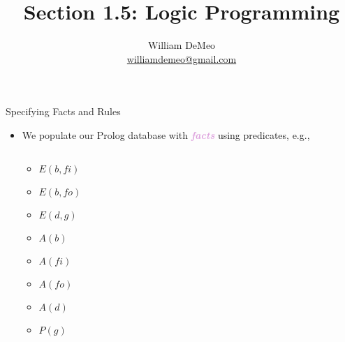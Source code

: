 \documentclass[xcolor=dvipsnames,9pt,hide notes]{beamer}
\title[Sec. 1.5: Logic Programming]{Section 1.5: Logic Programming}
\author[William DeMeo]{William DeMeo\\
{\small \url{williamdemeo@gmail.com}}}
\institute[\url{williamdemeo@gmail}]{
  \vskip-1cm
  {\small {\color{darkred}  University of South Carolina}}
}
\theoremstyle{definition}
\theoremstyle{remark}
\numberwithin{theorem}{section}
\numberwithin{claim}{section}
\numberwithin{equation}{section}
\numberwithin{conjecture}{section}
\newcommand{\defn}[1]{\textcolor{Plum}{\textit{\textbf{#1}}}}
\begin{document}
\thicklines
\setcounter{section}{+1}
\setcounter{secnumdepth}{2}


\frame[label=titlepage]{

  \titlepage
}

\begin{frame}[shrink=5]{Specifying Facts and Rules}
  \begin{itemize}
  \item We populate our Prolog database with \defn{facts} using predicates, e.g.,
  \begin{columns}
    \begin{column}{0.3\textwidth}
      \begin{center}
    \begin{itemize}
    \item $E(b, fi)$
    \item $E(b, fo)$
    \item $E(d, g)$
    \item $A(b)$
    \item $A( fi)$
    \item $A( fo)$
    \item $A(d)$
    \item $P(g)$
    \end{itemize}
      \end{center}
    \end{column}
  \begin{column}{0.4\textwidth}
  \end{column}
\end{columns}


\end{itemize}
\end{frame}
\end{document}
